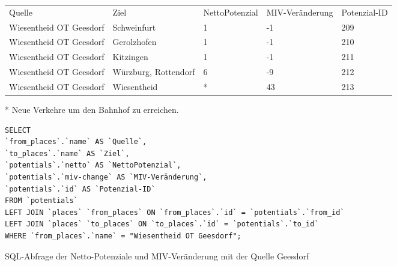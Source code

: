 \begin{tabularx}{\textwidth}{*5{X}}
Quelle & Ziel & NettoPotenzial & MIV-Veränderung & Potenzial-ID\\ 
Wiesentheid OT Geesdorf & Schweinfurt & 1 & -1 & 209\\ 
Wiesentheid OT Geesdorf & Gerolzhofen & 1 & -1 & 210\\ 
Wiesentheid OT Geesdorf & Kitzingen & 1 & -1 & 211\\ 
Wiesentheid OT Geesdorf & Würzburg, Rottendorf & 6 & -9 & 212\\ 
Wiesentheid OT Geesdorf & Wiesentheid & * & 43 & 213\\ 
\end{tabularx}    
\newline
\newline
* Neue Verkehre um den Bahnhof zu erreichen.
\newline
\begin{listing}[htbp]
\begin{verbatim}
SELECT
`from_places`.`name` AS `Quelle`, 
`to_places`.`name` AS `Ziel`, 
`potentials`.`netto` AS `NettoPotenzial`, 
`potentials`.`miv-change` AS `MIV-Veränderung`, 
`potentials`.`id` AS `Potenzial-ID`
FROM `potentials`
LEFT JOIN `places` `from_places` ON `from_places`.`id` = `potentials`.`from_id`
LEFT JOIN `places` `to_places` ON `to_places`.`id` = `potentials`.`to_id`
WHERE `from_places`.`name` = "Wiesentheid OT Geesdorf";
\end{verbatim}
\caption{SQL-Abfrage der Netto-Potenziale und MIV-Veränderung mit der Quelle Geesdorf}\label{lst-fz-geesdorf}
\end{listing}